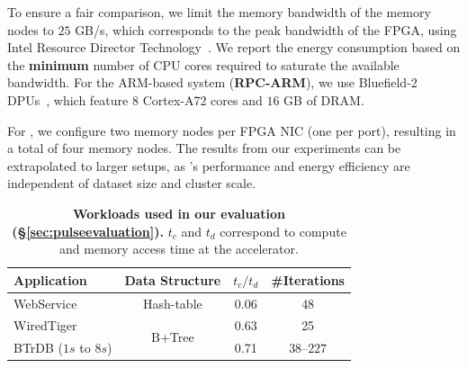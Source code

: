 To ensure a fair comparison, we limit the memory bandwidth of the memory nodes to $25$ GB/s, which corresponds to the peak bandwidth of the FPGA, using Intel Resource Director Technology~\cite{intel_cmt_cat}. We report the energy consumption based on the \textbf{minimum} number of CPU cores required to saturate the available bandwidth. For the ARM-based system (\textbf{RPC-ARM}), we use Bluefield-2 DPUs~\cite{bluefield}, which feature $8$ Cortex-A72 cores and $16$ GB of DRAM. 

For \pulse, we configure two memory nodes per FPGA NIC (one per port), resulting in a total of four memory nodes. The results from our experiments can be extrapolated to larger setups, as \pulse's performance and energy efficiency are independent of dataset size and cluster scale.


\begin{table}[!t]
  \centering
  \bgroup
  \small
  \def\arraystretch{0.95}%
  \begin{tabular}{l|c|c|c} 
        \hline
        \textbf{Application} & \textbf{Data Structure} & \textbf{$t_c/t_d$} & \textbf{\#Iterations} \\\hline\hline
        WebService & Hash-table & 0.06 & 48 \\\hline
        WiredTiger & \multirow{2}{*}{B+Tree} & 0.63 & 25 \\\cline{1-1}\cline{3-4}
        BTrDB ($1s$ to $8s$) & & 0.71 & $38$--$227$ \\\hline
  \end{tabular}
  \egroup
  \caption[Workloads used in our evaluation]{\textbf{Workloads used in our evaluation (\S\ref{sec:pulseevaluation}).} $t_c$ and $t_d$ correspond to compute and memory access time at the \pulse accelerator.} 
  \label{tab:workloads}
\end{table}

